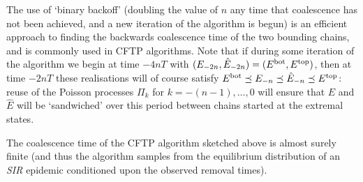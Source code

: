 \documentclass[]{article}
\newcommand{\Epidemic}{E}%
\newcommand{\SIR}{\emph{SIR}\xspace}
\newcommand{\ple}{\preceq}
\newcommand{\Poisson}{\Pi}
\newcommand{\early}[1]{#1}
\newcommand{\late}[1]{\hat{#1}}
\newcommand{\Bot}[1][]{{}^{\textup{bot}#1}}
\newcommand{\Top}[1][]{{}^{\textup{top}#1}}
\begin{document}
The use of `binary backoff' (doubling the value of \(n\) any time that coalescence has not been achieved, and a new iteration of the algorithm is begun) is an efficient approach to finding the backwards coalescence time of the two bounding chains, and is commonly used in CFTP algorithms. Note that if during some iteration of the algorithm we begin at time \(-4nT\) with \((\early\Epidemic_{-2n},\late\Epidemic_{-2n}) = (\Epidemic\Bot,\Epidemic\Top)\), then at time \(-2nT\) these realisations will of course satisfy \(\Epidemic\Bot \ple \early\Epidemic_{-n} \ple \late\Epidemic_{-n} \ple \Epidemic\Top\): reuse of the Poisson processes \(\Poisson_k\) for \(k=-(n-1),\dots,0\) will ensure that \(\early\Epidemic\) and \(\late\Epidemic\) will be `sandwiched' over this period between chains started at the extremal states.


\begin{thm}\label{thm:CFTP_works}
	The coalescence time of the CFTP algorithm sketched above is almost surely finite (and thus the algorithm samples from the equilibrium distribution of an \SIR epidemic conditioned upon the observed removal times).
\end{thm}
\end{document}
